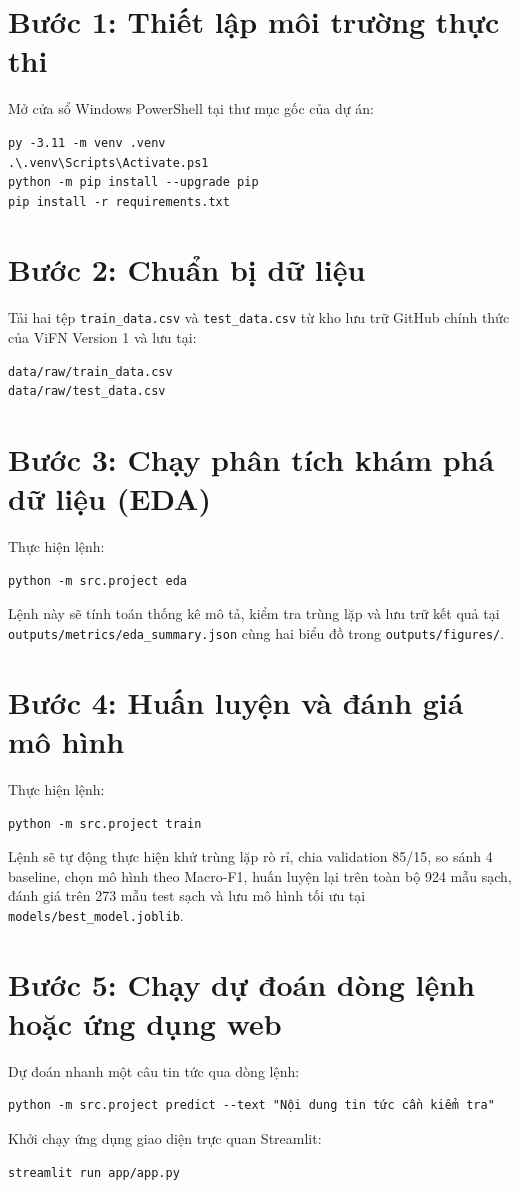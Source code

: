 \documentclass[12pt,a4paper]{report}
\begin{document}
\section*{Bước 1: Thiết lập môi trường thực thi}
Mở cửa sổ Windows PowerShell tại thư mục gốc của dự án:
\begin{verbatim}
py -3.11 -m venv .venv
.\.venv\Scripts\Activate.ps1
python -m pip install --upgrade pip
pip install -r requirements.txt
\end{verbatim}

\section*{Bước 2: Chuẩn bị dữ liệu}
Tải hai tệp \texttt{train\_data.csv} và \texttt{test\_data.csv} từ kho lưu trữ GitHub chính thức của ViFN Version 1 và lưu tại:
\begin{verbatim}
data/raw/train_data.csv
data/raw/test_data.csv
\end{verbatim}

\section*{Bước 3: Chạy phân tích khám phá dữ liệu (EDA)}
Thực hiện lệnh:
\begin{verbatim}
python -m src.project eda
\end{verbatim}
Lệnh này sẽ tính toán thống kê mô tả, kiểm tra trùng lặp và lưu trữ kết quả tại \texttt{outputs/metrics/eda\_summary.json} cùng hai biểu đồ trong \texttt{outputs/figures/}.

\section*{Bước 4: Huấn luyện và đánh giá mô hình}
Thực hiện lệnh:
\begin{verbatim}
python -m src.project train
\end{verbatim}
Lệnh sẽ tự động thực hiện khử trùng lặp rò rỉ, chia validation 85/15, so sánh 4 baseline, chọn mô hình theo Macro-F1, huấn luyện lại trên toàn bộ 924 mẫu sạch, đánh giá trên 273 mẫu test sạch và lưu mô hình tối ưu tại \texttt{models/best\_model.joblib}.

\section*{Bước 5: Chạy dự đoán dòng lệnh hoặc ứng dụng web}
Dự đoán nhanh một câu tin tức qua dòng lệnh:
\begin{verbatim}
python -m src.project predict --text "Nội dung tin tức cần kiểm tra"
\end{verbatim}

Khởi chạy ứng dụng giao diện trực quan Streamlit:
\begin{verbatim}
streamlit run app/app.py
\end{verbatim}
\end{document}
